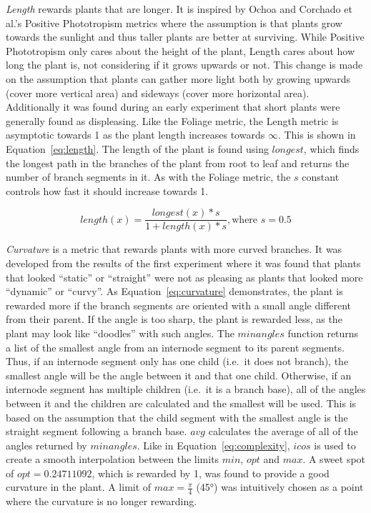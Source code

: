 \textit{Length} rewards plants that are longer.
It is inspired by Ochoa and Corchado et al.'s Positive Phototropism metrics where the assumption is that plants grow towards the sunlight and thus taller plants are better at surviving.
While Positive Phototropism only cares about the height of the plant, Length cares about how long the plant is, not considering if it grows upwards or not.
This change is made on the assumption that plants can gather more light both by growing upwards (cover more vertical area) and sideways (cover more horizontal area).
Additionally it was found during an early experiment that short plants were generally found as displeasing.
Like the Foliage metric, the Length metric is asymptotic towards 1 as the plant length increases towards $\infty$.
This is shown in Equation~\ref{eq:length}.
The length of the plant is found using $longest$, which finds the longest path in the branches of the plant from root to leaf and returns the number of branch segments in it.
As with the Foliage metric, the $s$ constant controls how fast it should increase towards 1.

\begin{equation}
\label{eq:length}
    length(x) = \frac{longest(x) * s}{1 + length(x) * s}, \text{where } s = 0.5
\end{equation}

\textit{Curvature} is a metric that rewards plants with more curved branches.
It was developed from the results of the first experiment where it was found that plants that looked ``static'' or ``straight'' were not as pleasing as plants that looked more ``dynamic'' or ``curvy''.
As Equation~\ref{eq:curvature} demonstrates, the plant is rewarded more if the branch segments are oriented with a small angle different from their parent.
If the angle is too sharp, the plant is rewarded less, as the plant may look like ``doodles'' with such angles.
The $minangles$ function returns a list of the smallest angle from an internode segment to its parent segments.
Thus, if an internode segment only has one child (i.e.\ it does not branch), the smallest angle will be the angle between it and that one child.
Otherwise, if an internode segment has multiple children (i.e.\ it is a branch base), all of the angles between it and the children are calculated and the smallest will be used.
This is based on the assumption that the child segment with the smallest angle is the straight segment following a branch base.
$avg$ calculates the average of all of the angles returned by $minangles$.
Like in Equation~\ref{eq:complexity}, $icos$ is used to create a smooth interpolation between the limits $min$, $opt$ and $max$.
A sweet spot of $opt = 0.24711092$, which is rewarded by 1, was found to provide a good curvature in the plant.
A limit of $max = \frac{\pi}{4}$ (45°) was intuitively chosen as a point where the curvature is no longer rewarding.


